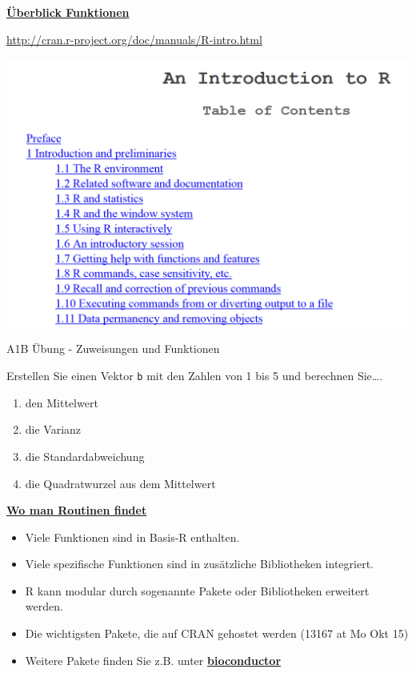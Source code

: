 \documentclass[ignorenonframetext,]{beamer}
\providecommand{\tightlist}{%
  \setlength{\itemsep}{0pt}\setlength{\parskip}{0pt}}
\begin{document}
\begin{frame}{\href{http://cran.r-project.org/doc/manuals/R-intro.html}{\textbf{Überblick
Funktionen}}}
\protect\hypertarget{uberblick-funktionen}{}

\url{http://cran.r-project.org/doc/manuals/R-intro.html}

\includegraphics{figure/UebersichtBefehle.PNG}

\end{frame}

\begin{frame}[fragile]{A1B Übung - Zuweisungen und Funktionen}
\protect\hypertarget{a1b-ubung---zuweisungen-und-funktionen}{}

Erstellen Sie einen Vektor \texttt{b} mit den Zahlen von 1 bis 5 und
berechnen Sie\ldots{}.

\begin{enumerate}
\item
  den Mittelwert
\item
  die Varianz
\item
  die Standardabweichung
\item
  die Quadratwurzel aus dem Mittelwert
\end{enumerate}

\end{frame}

\begin{frame}{\href{https://stats.idre.ucla.edu/r/seminars/intro/}{\textbf{Wo
man Routinen findet}}}
\protect\hypertarget{wo-man-routinen-findet}{}

\begin{itemize}
\tightlist
\item
  Viele Funktionen sind in Basis-R enthalten.
\item
  Viele spezifische Funktionen sind in zusätzliche Bibliotheken
  integriert.
\item
  R kann modular durch sogenannte Pakete oder Bibliotheken erweitert
  werden.
\item
  Die wichtigsten Pakete, die auf CRAN gehostet werden (13167 at Mo Okt
  15)
\item
  Weitere Pakete finden Sie z.B. unter
  \href{www.bioconductor.org}{\textbf{bioconductor}}
\end{itemize}

\end{frame}
\end{document}
